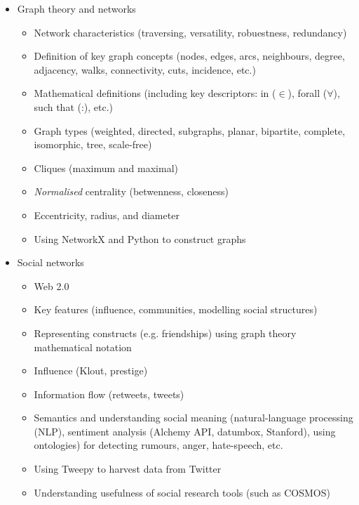 \documentclass[11pt,a4paper]{report}
\begin{document}
\begin{itemize}
    \item Graph theory and networks
        \begin{itemize}
            \item Network characteristics (traversing, versatility, robuestness, redundancy)
            \item Definition of key graph concepts (nodes, edges, arcs, neighbours, degree, adjacency, walks, connectivity, cuts, incidence, etc.)
            \item Mathematical definitions (including key descriptors: in ($\in$), forall ($\forall$), such that (:), etc.)
            \item Graph types (weighted, directed, subgraphs, planar, bipartite, complete, isomorphic, tree, scale-free)
            \item Cliques (maximum and maximal)
            \item \textit{Normalised} centrality (betwenness, closeness)
            \item Eccentricity, radius, and diameter
            \item Using NetworkX and Python to construct graphs
        \end{itemize}

    \item Social networks
        \begin{itemize}
            \item Web 2.0
            \item Key features (influence, communities, modelling social structures)
            \item Representing constructs (e.g. friendships) using graph theory mathematical notation
            \item Influence (Klout, prestige)
            \item Information flow (retweets, tweets)
            \item Semantics and understanding social meaning (natural-language processing (NLP), sentiment analysis (Alchemy API, datumbox, Stanford), using ontologies) for detecting rumours, anger, hate-speech, etc.
            \item Using Tweepy to harvest data from Twitter 
            \item Understanding usefulness of social research tools (such as COSMOS)
        \end{itemize}


\end{itemize}
\end{document}
